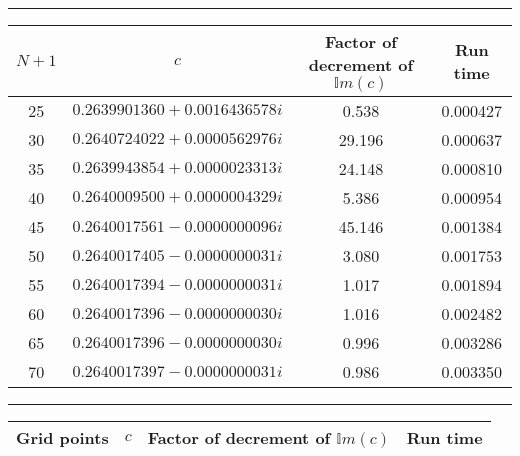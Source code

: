 \documentclass[a4paper, 12pt, twoside, openright]{article}
\numberwithin{equation}{section}
\begin{document}
\begin{table}[ht]
\centering
\rule{\linewidth}{1.5pt}
\bgroup
\def\arraystretch{1.25}
\begin{tabular}{ c@{\qquad} c@{\qquad} c@{\qquad} c@{\qquad} }
$N+1$ & $c$ & \parbox{4cm}{\centering Factor of decrement \\of $\mathbb{I}m(c)$} & Run time \\ & $0.2639901360 + 0.0016436578i$ & 0.538 & 0.000427\\ %
30 & $0.2640724022 + 0.0000562976i$ & 29.196 & 0.000637\\ %
35 & $0.2639943854 + 0.0000023313i$ & 24.148 & 0.000810\\ %
40 & $0.2640009500 + 0.0000004329i$ & 5.386 & 0.000954 \\ %
45 & $0.2640017561 - 0.0000000096i$ & 45.146 &  0.001384 \\ %
50 & $0.2640017405 - 0.0000000031i$ & 3.080 & 0.001753\\ %
55 & $0.2640017394 - 0.0000000031i$ & 1.017 & 0.001894 \\ %
60 & $0.2640017396 - 0.0000000030i$ & 1.016 & 0.002482 \\ %
65 & $0.2640017396 - 0.0000000030i$ & 0.996 & 0.003286\\ %
70 & $0.2640017397 - 0.0000000031i$ & 0.986 & 0.003350 %
\end{tabular}
\egroup
{}
\bgroup \centering
\rule{\linewidth}{1.5pt}
\egroup
\bgroup
\def\arraystretch{1.25}
\begin{tabular}{ c@{\qquad} c@{\qquad} c@{\qquad} c@{\qquad} }
Grid points & $c$ & \parbox{4cm}{\centering Factor of decrement \\of $\mathbb{I}m(c)$} & Run time \\\hline

\end{tabular}
\end{table}
\end{document}

